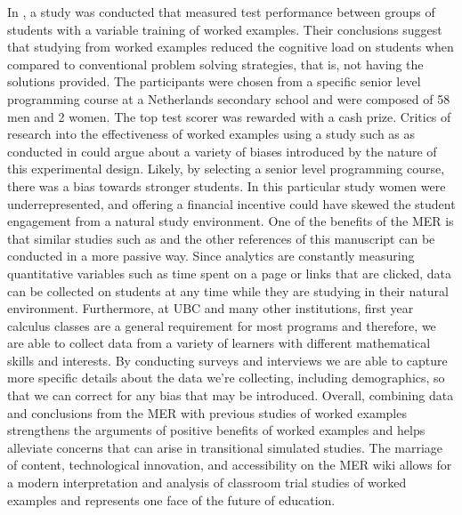 \documentclass{primus}
\begin{document}
\noindent{}In \cite{PM}, a study was conducted that measured test performance between groups of students with a variable training of worked examples.  Their conclusions suggest that studying from worked examples reduced the cognitive load on students when compared to conventional problem solving strategies, that is,  not having the solutions provided.  The participants were chosen from a specific senior level programming course at a Netherlands secondary school and were composed of 58 men and 2 women.  The top test scorer was rewarded with a cash prize.  Critics of research into the effectiveness of worked examples using a study such as as conducted in \cite{PM} could argue about a variety of biases introduced by the nature of this experimental design.  Likely, by selecting a senior level programming course, there was a bias towards stronger students.  In this particular study women were underrepresented, and offering a financial incentive could have skewed the student engagement from a natural study environment.  One of the benefits of the MER is that similar studies such as \cite{PM} and the other references of this manuscript can be conducted in a more passive way.  Since analytics are constantly measuring quantitative variables such as time spent on a page or links that are clicked, data can be collected on students at any time while they are studying in their natural environment.  Furthermore, at UBC and many other institutions, first year calculus classes are a general requirement for most programs and therefore, we are able to collect data from a variety of learners with different mathematical skills and interests.  By conducting surveys and interviews we are able to capture more specific details about the data we’re collecting, including demographics, so that we can correct for any bias that may be introduced.   Overall, combining data and conclusions from the MER with previous studies of worked examples strengthens the arguments of positive benefits of worked examples and helps alleviate concerns that can arise in transitional simulated studies. The marriage of content, technological innovation, and accessibility on the MER wiki allows for a modern interpretation and analysis of classroom trial studies of worked examples and represents one face of the future of education. 
\\\\
\end{document}
